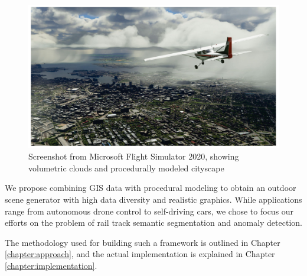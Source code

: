 \begin{figure}[H]
    \centering
    \includegraphics[width=\textwidth]{src/img/reated-pics/flight-sim.jpg}
    \caption{Screenshot from Microsoft Flight Simulator 2020, showing volumetric clouds and procedurally modeled cityscape \cite{bengtsson2022efficient}}
    \label{fig:relatex-example-msft}
\end{figure}

We propose combining GIS data with procedural modeling to obtain an outdoor scene generator with high data diversity and realistic graphics. While applications range from autonomous drone control to self-driving cars, we chose to focus our efforts on the problem of rail track semantic segmentation and anomaly detection.

The methodology used for building such a framework is outlined in Chapter \ref{chapter:approach}, and the actual implementation is explained in Chapter \ref{chapter:implementation}.